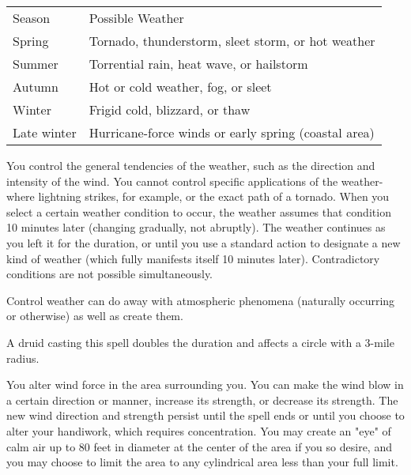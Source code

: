 \begin{multicols}{2}
\begin{small}
\begin{center}
\begin{tabular}[h!]{l|p{2in}}
Season & Possible Weather \\
Spring & Tornado, thunderstorm, sleet storm, or hot weather	\\
Summer & Torrential rain, heat wave, or hailstorm	\\
Autumn & Hot or cold weather, fog, or sleet	\\
Winter & Frigid cold, blizzard, or thaw	\\
Late winter & Hurricane-force winds or early spring (coastal area) \\
\end{tabular}
\end{center}

\smallskip\noindent You control the general tendencies of the weather, such as the direction and intensity of the wind. You cannot control specific applications of the weather-where lightning strikes, for example, or the exact path of a tornado. When you select a certain weather condition to occur, the weather assumes that condition 10 minutes later (changing gradually, not abruptly). The weather continues as you left it for the duration, or until you use a standard action to designate a new kind of weather (which fully manifests itself 10 minutes later). Contradictory conditions are not possible simultaneously.

\smallskip\noindent Control weather can do away with atmospheric phenomena (naturally occurring or otherwise) as well as create them.

\smallskip\noindent A druid casting this spell doubles the duration and affects a circle with a 3-mile radius.

\noindent You alter wind force in the area surrounding you. You can make the wind blow in a certain direction or manner, increase its strength, or decrease its strength. The new wind direction and strength persist until the spell ends or until you choose to alter your handiwork, which requires concentration. You may create an "eye" of calm air up to 80 feet in diameter at the center of the area if you so desire, and you may choose to limit the area to any cylindrical area less than your full limit.


\end{small}
\end{multicols}
